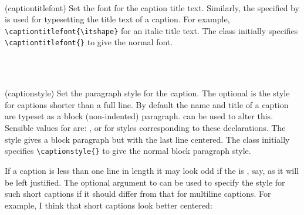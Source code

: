\begin{syntax}
\cmd{\captiontitlefont} \\
\end{syntax}
\glossary(captiontitlefont)%
  {}%
  {Set the font for the caption title text.}
 Similarly, the  specified by \cmd{\captiontitlefont}
is used for typesetting the title text of a caption. 
For example,
\verb?\captiontitlefont{\itshape}? for an italic title text.
The class initially specifies \verb?\captiontitlefont{}?
to give the normal font.

\begin{syntax}
\cmd{\captionstyle} \\
\cmd{\raggedleft} \cmd{\centering} \cmd{\raggedright} \cmd{\centerlastline} \\
\end{syntax}
\glossary(captionstyle)%
  {}%
  {Set the paragraph style for the caption. The optional  is
   the style for captions shorter than a full line.}
   By default the name and title of a caption are typeset as a block 
(non-indented) paragraph. 
\cmd{\captionstyle} can be used to alter this.
Sensible values for  are: \cmd{\centering}, \cmd{\raggedleft} or
\cmd{\raggedright} for styles 
corresponding to these declarations. 
The \cmd{\centerlastline} style gives a block paragraph
but with the last line centered.
The class initially specifies \verb?\captionstyle{}?
to give the normal block paragraph style.

    If a caption is less than one line in length it may look odd if the
 is \cmd{\raggedright}, say, as it will be left justified. 
The optional  argument to \cmd{\captionstyle} can be used to
specify the style for such short captions 
if it should differ from that for multiline 
captions. For example, I think that short captions look better 
centered:
\begin{lcode}
\captionstyle[\centering]{\raggedright}
\end{lcode} 

